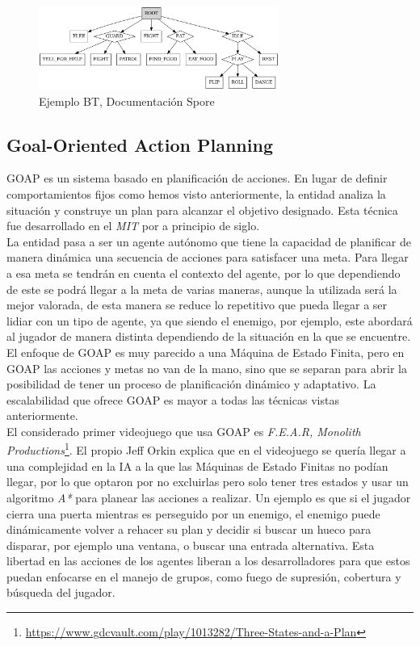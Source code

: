 \begin{figure}[t]
	\centering
	\includegraphics[width = 0.7\textwidth]{Imagenes/BT_Spoore.png}
	\caption{Ejemplo BT, Documentación Spore}
	\label{fig:BT Spore}
\end{figure}
\subsection{Goal-Oriented Action Planning}

GOAP es un sistema basado en planificación de acciones. En lugar de definir comportamientos fijos como hemos visto anteriormente, la entidad analiza la situación y construye un plan para alcanzar el objetivo designado.
Esta técnica fue desarrollado en el \textit{MIT} por \textit{\citet{GOAP_Jeff_Orkin}} a principio de siglo. \\

La entidad pasa a ser un agente autónomo que tiene la capacidad de planificar de manera dinámica una secuencia de acciones para satisfacer una meta. Para llegar a esa meta se tendrán en cuenta el contexto del agente, por lo que dependiendo de este se podrá llegar a la meta de varias maneras, aunque la utilizada será la mejor valorada, de esta manera se reduce lo repetitivo que pueda llegar a ser lidiar con un tipo de agente, ya que siendo el enemigo, por ejemplo, este abordará al jugador de manera distinta dependiendo de la situación en la que se encuentre.\\

El enfoque de GOAP es muy parecido a una Máquina de Estado Finita, pero en GOAP las acciones y metas no van de la mano, sino que se separan para abrir la posibilidad de tener un proceso de planificación dinámico y adaptativo.
La escalabilidad que ofrece GOAP es mayor a todas las técnicas vistas anteriormente.\\

El considerado primer videojuego que usa GOAP es \textit{F.E.A.R, Monolith Productions}\footnote{\url{https://www.gdcvault.com/play/1013282/Three-States-and-a-Plan}}. El propio Jeff Orkin explica que en el videojuego se quería llegar a una complejidad en la IA a la que las Máquinas de Estado Finitas no podían llegar, por lo que optaron por no excluirlas pero solo tener tres estados y usar un algoritmo \textit{A*} para planear las acciones a realizar. Un ejemplo es que si el jugador cierra una puerta mientras es perseguido por un enemigo, el enemigo puede dinámicamente volver a rehacer su plan y decidir si buscar un hueco para disparar, por ejemplo una ventana, o buscar una entrada alternativa. Esta libertad en las acciones de los agentes liberan a los desarrolladores para que estos puedan enfocarse en el manejo de grupos, como fuego de supresión, cobertura y búsqueda del jugador.\\

